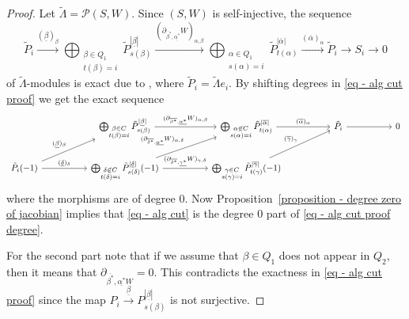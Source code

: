 \documentclass[a4paper, reqno]{amsart}
\theoremstyle{definition}
\begin{document}
\begin{proof}
	Let $\tilde{\Lambda} = \mathcal{P}(S, W)$. Since $(S, W)$ is self-injective, the sequence
	\begin{equation}\label{eq - alg cut proof}
		\tilde{P}_i\xrightarrow{(\underline{\beta})_\beta} \bigoplus_{\substack{\beta\in Q_1 \\ t(\beta) = i}}\tilde{P}_{s(\beta)}^{|\underline{\beta}|} \xrightarrow{(\partial_{\overline{\beta^*}, \underline{\alpha^*}}W)_{\alpha, \beta}} \bigoplus_{\substack{\alpha\in Q_1 \\ s(\alpha) = i}}\tilde{P}_{t(\alpha)}^{|\overline{\alpha}|}\xrightarrow{(\overline{\alpha})_\alpha} \tilde{P}_i\to S_i\to 0
	\end{equation}
	of $\tilde{\Lambda}$-modules is exact due to \cite[Proposition 5.2]{soderberg2024mutation}, where $\tilde{P}_i = \tilde{\Lambda}e_i$. By shifting degrees in \eqref{eq - alg cut proof} we get the exact sequence
	\begin{equation}\label{eq - alg cut proof degree}
		\begin{tikzcd}[column sep = 1.8cm]
			& \bigoplus_{\substack{\beta\in C \\ t(\beta) = i}}\tilde{P}_{s(\beta)}^{|\underline{\beta}|} \arrow[r, "(\partial_{\overline{\beta^*}, \underline{\alpha^*}}W)_{\alpha, \beta}"] & \bigoplus_{\substack{\alpha\not\in C \\ s(\alpha) = i}}\tilde{P}_{t(\alpha)}^{|\overline{\alpha}|} \arrow[r, "(\overline{\alpha})_\alpha"] & \tilde{P}_i \arrow[r] & 0 \\
			\tilde{P}_i(-1) \arrow[ru, "(\underline{\beta})_\beta"] \arrow[r, "(\underline{\delta})_\delta"] & \bigoplus_{\substack{\delta\not\in C \\ t(\delta) = i}}\tilde{P}_{s(\delta)}^{|\underline{\delta}|}(-1) \arrow[ru, "(\partial_{\overline{\delta^*}, \underline{\alpha^*}}W)_{\alpha, \delta}"] \arrow[r, "(\partial_{\overline{\delta^*}, \underline{\gamma^*}}W)_{\gamma, \delta}"] & \bigoplus_{\substack{\gamma\in C \\ s(\gamma) = i}}\tilde{P}_{t(\gamma)}^{|\overline{\gamma}|}(-1) \arrow[ru, "(\overline{\gamma})_\gamma"]
		\end{tikzcd}
	\end{equation}
	where the morphisms are of degree $0$. Now Proposition~\ref{proposition - degree zero of jacobian} implies that \eqref{eq - alg cut} is the degree $0$ part of \eqref{eq - alg cut proof degree}.

	For the second part note that if we assume that $\beta\in Q_1$ does not appear in $Q_2$, then it means that $\partial_{\overline{\beta^*}, \underline{\alpha^*} W} = 0$. This contradicts the exactness in \eqref{eq - alg cut proof} since the map $P_i \xrightarrow{\underline{\beta}}P_{s(\beta)}^{|\underline{\beta}|}$ is not surjective.
\end{proof}
\end{document}
